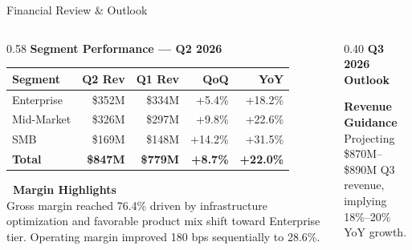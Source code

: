 \documentclass[11pt,aspectratio=169]{beamer}
\begin{document}
\begin{frame}{Financial Review \& Outlook}

  \vspace{0.1cm}

  \begin{columns}[T]
    \begin{column}{0.58\textwidth}
      \textbf{\color{nxnavy}Segment Performance — Q2 2026}

      \vspace{0.2cm}

      \renewcommand{\arraystretch}{1.35}
      \begin{tabular}{l r r r r}
        \toprule
        \textbf{Segment} & \textbf{Q2 Rev} & \textbf{Q1 Rev} & \textbf{QoQ} & \textbf{YoY} \\
        \midrule
        Enterprise  & \$352M & \$334M & +5.4\%  & +18.2\% \\
        \rowcolor{nxlight}
        Mid-Market  & \$326M & \$297M & +9.8\%  & +22.6\% \\
        SMB         & \$169M & \$148M & +14.2\% & +31.5\% \\
        \midrule
        \textbf{Total} & \textbf{\$847M} & \textbf{\$779M} & \textbf{+8.7\%} & \textbf{+22.0\%} \\
        \bottomrule
      \end{tabular}

      \vspace{0.3cm}

      \begin{tcolorbox}[outlookbox]
        \footnotesize
        \textbf{\color{nxnavy}\faCheckCircle\ Margin Highlights}\\[0.15cm]
        Gross margin reached 76.4\% driven by infrastructure optimization and
        favorable product mix shift toward Enterprise tier. Operating margin
        improved 180 bps sequentially to 28.6\%.
      \end{tcolorbox}
    \end{column}
    \begin{column}{0.40\textwidth}
      \textbf{\color{nxnavy}Q3 2026 Outlook}

      \vspace{0.2cm}

      \begin{tcolorbox}[outlookbox]
        \small
        \textbf{\color{nxnavy}Revenue Guidance}\\[0.15cm]
        Projecting \$870M--\$890M Q3 revenue,\\[0.05cm]
        implying 18\%--20\% YoY growth.
      \end{tcolorbox}


\end{column}
\end{columns}
\end{frame}
\end{document}

